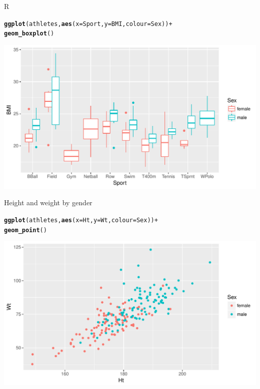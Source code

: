 \documentclass[unknownkeysallowed]{beamer}\usepackage[]{graphicx}\usepackage[]{color}
\makeatletter
\def\maxwidth{ %
  \ifdim\Gin@nat@width>\linewidth
    \linewidth
  \else
    \Gin@nat@width
  \fi
}
\newcommand{\hlopt}[1]{\textcolor[rgb]{0,0,0}{#1}}%
\newcommand{\hlstd}[1]{\textcolor[rgb]{0.345,0.345,0.345}{#1}}%
\newcommand{\hlkwc}[1]{\textcolor[rgb]{0.333,0.667,0.333}{#1}}%
\newcommand{\hlkwd}[1]{\textcolor[rgb]{0.737,0.353,0.396}{\textbf{#1}}}%
\newenvironment{kframe}{%
 \def\at@end@of@kframe{}%
 \ifinner\ifhmode%
  \def\at@end@of@kframe{\end{minipage}}%
  \begin{minipage}{\columnwidth}%
 \fi\fi%
 \def\FrameCommand##1{\hskip\@totalleftmargin \hskip-\fboxsep
 \colorbox{shadecolor}{##1}\hskip-\fboxsep
     \hskip-\linewidth \hskip-\@totalleftmargin \hskip\columnwidth}%
 \MakeFramed {\advance\hsize-\width
   \@totalleftmargin\z@ \linewidth\hsize
   \@setminipage}}%
 {\par\unskip\endMakeFramed%
 \at@end@of@kframe}
\newenvironment{knitrout}{}{} %
\makeatother
\begin{document}
\begin{frame}[fragile]{R}
  
\begin{knitrout}
\color{fgcolor}\begin{kframe}
\begin{alltt}
\hlkwd{ggplot}\hlstd{(athletes,}\hlkwd{aes}\hlstd{(}\hlkwc{x}\hlstd{=Sport,}\hlkwc{y}\hlstd{=BMI,}\hlkwc{colour}\hlstd{=Sex))}\hlopt{+}
  \hlkwd{geom_boxplot}\hlstd{()}
\end{alltt}
\end{kframe}
\includegraphics[width=\maxwidth]{figure/unnamed-chunk-30-1} 

\end{knitrout}
  
\end{frame}

\begin{frame}[fragile]{Height and weight by gender}

\begin{knitrout}
\color{fgcolor}\begin{kframe}
\begin{alltt}
\hlkwd{ggplot}\hlstd{(athletes,}\hlkwd{aes}\hlstd{(}\hlkwc{x}\hlstd{=Ht,}\hlkwc{y}\hlstd{=Wt,}\hlkwc{colour}\hlstd{=Sex))}\hlopt{+}
  \hlkwd{geom_point}\hlstd{()}
\end{alltt}
\end{kframe}
\includegraphics[width=\maxwidth]{figure/unnamed-chunk-31-1} 

\end{knitrout}
  
\end{frame}
\end{document}
